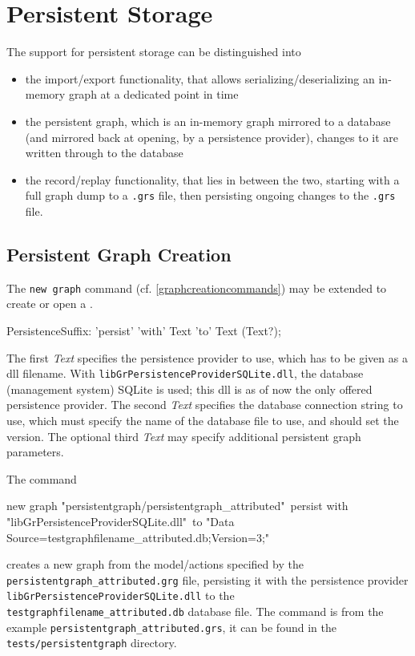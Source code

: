 \chapter{Persistent Storage}
\label{cha:persistentstorage}

The support for persistent storage can be distinguished into
\begin{itemize}
	\item the import/export functionality, that allows serializing/deserializing an in-memory graph at a dedicated point in time
	\item the persistent graph, which is an in-memory graph mirrored to a database (and mirrored back at opening, by a persistence provider), changes to it are written through to the database
	\item the record/replay functionality, that lies in between the two, starting with a full graph dump to a \texttt{.grs} file, then persisting ongoing changes to the \texttt{.grs} file.
\end{itemize}


\section{Persistent Graph Creation}
\label{persistentgraphcreationcommands}

The \texttt{new graph} command (cf. \ref{graphcreationcommands}) may be extended to create or open a .

\begin{rail}
  PersistenceSuffix: 'persist' 'with' Text 'to' Text (Text?);
\end{rail}
The first \emph{Text} specifies the persistence provider to use, which has to be given as a dll filename.
With \texttt{libGrPersistenceProviderSQLite.dll}, the database (management system) SQLite\cite{SQLite} is used; this dll is as of now the only offered persistence provider.
The second \emph{Text} specifies the database connection string to use, which must specify the name of the database file to use, and should set the version.
The optional third \emph{Text} may specify additional persistent graph parameters.

\begin{example}
The command
\begin{grshelllet}
new graph "persistentgraph/persistentgraph_attributed"\
persist with "libGrPersistenceProviderSQLite.dll"\
to "Data Source=testgraphfilename_attributed.db;Version=3;"
\end{grshelllet}
creates a new graph from the model/actions specified by the \texttt{persistentgraph\_attributed.grg} file, persisting it with the persistence provider \texttt{libGrPersistenceProviderSQLite.dll} to the \texttt{testgraphfilename\_attributed.db} database file.
The command is from the example \texttt{persistentgraph\_attributed.grs}, it can be found in the \texttt{tests/persistentgraph} directory.
\end{example}

